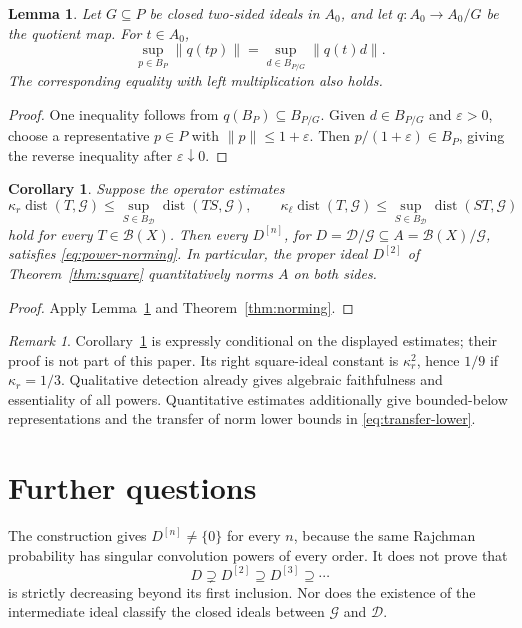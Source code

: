 \documentclass[11pt,reqno]{amsart}
\newtheorem{lemma}[theorem]{Lemma}
\newtheorem{corollary}[theorem]{Corollary}
\theoremstyle{definition}
\theoremstyle{remark}
\newtheorem{remark}[theorem]{Remark}
\newcommand{\B}{\mathcal B}
\newcommand{\D}{\mathcal D}
\newcommand{\G}{\mathcal G}
\newcommand{\dist}{\operatorname{dist}}
\begin{document}
\begin{lemma}\label{lem:ball}
Let $G\subseteq P$ be closed two-sided ideals in $A_0$, and let $q:A_0\to A_0/G$ be the quotient map. For $t\in A_0$,
\[
 \sup_{p\in B_P}\|q(tp)\|
 =\sup_{d\in B_{P/G}}\|q(t)d\|.
\]
The corresponding equality with left multiplication also holds.
\end{lemma}
\begin{proof}
One inequality follows from $q(B_P)\subseteq B_{P/G}$. Given $d\in B_{P/G}$ and $\varepsilon>0$, choose a representative $p\in P$ with $\|p\|\leq1+\varepsilon$. Then $p/(1+\varepsilon)\in B_P$, giving the reverse inequality after $\varepsilon\downarrow0$.
\end{proof}

\begin{corollary}\label{cor:conditional}
Suppose the operator estimates
\[
 \kappa_r\dist(T,\G)\leq
 \sup_{S\in B_\D}\dist(TS,\G),\qquad
 \kappa_\ell\dist(T,\G)\leq
 \sup_{S\in B_\D}\dist(ST,\G)
\]
hold for every $T\in\B(X)$. Then every $D^{[n]}$, for $D=\D/\G\subseteq A=\B(X)/\G$, satisfies \eqref{eq:power-norming}. In particular, the proper ideal $D^{[2]}$ of Theorem~\ref{thm:square} quantitatively norms $A$ on both sides.
\end{corollary}
\begin{proof}
Apply Lemma~\ref{lem:ball} and Theorem~\ref{thm:norming}.
\end{proof}

\begin{remark}
Corollary~\ref{cor:conditional} is expressly conditional on the displayed estimates; their proof is not part of this paper. Its right square-ideal constant is $\kappa_r^2$, hence $1/9$ if $\kappa_r=1/3$. Qualitative detection already gives algebraic faithfulness and essentiality of all powers. Quantitative estimates additionally give bounded-below representations and the transfer of norm lower bounds in \eqref{eq:transfer-lower}.
\end{remark}

\section{Further questions}

The construction gives $D^{[n]}\ne\{0\}$ for every $n$, because the same Rajchman probability has singular convolution powers of every order. It does not prove that
\[
 D\supsetneq D^{[2]}\supseteq D^{[3]}\supseteq\cdots
\]
is strictly decreasing beyond its first inclusion. Nor does the existence of the intermediate ideal classify the closed ideals between $\G$ and $\D$.
\end{document}
